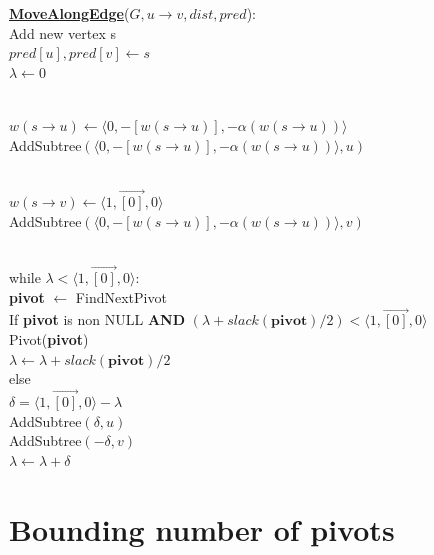 \documentclass{article}
\begin{document}
\begin{center}
\begin{algorithm}
\textbf{\underline{MoveAlongEdge}}($G, u \rightarrow v, dist, pred$): \\ \quad
Add new vertex s \\ \quad
$pred[u], pred[v] \leftarrow s$ \\ \quad
$\lambda \leftarrow 0$ \\ \\ \quad

$w(s \rightarrow u) \leftarrow \langle 0, -[w(s \rightarrow u)], 
-\alpha(w(s \rightarrow u)) \rangle$ \\ \quad
AddSubtree$(\langle 0, -[w(s \rightarrow u)], 
-\alpha(w(s \rightarrow u)) \rangle, u)$ \\ \\ \quad

$w(s \rightarrow v) \leftarrow \langle 1, \vec{[0]}, 0 \rangle$ \\ \quad
AddSubtree$(\langle 0, -[w(s \rightarrow u)], 
-\alpha(w(s \rightarrow u)) \rangle, v)$ \\ \\ \quad

while $\lambda < \langle 1, \vec{[0]}, 0 \rangle$: \\ \quad \quad
    \textbf{pivot} $\leftarrow $ FindNextPivot \\ \quad \quad
    If \textbf{pivot} is non NULL \textbf{AND} 
    $(\lambda + slack(\textbf{pivot}) / 2) < \langle 1, \vec{[0]}, 0 \rangle$ \\ \qquad \quad
        Pivot(\textbf{pivot}) \\ \qquad \quad
        $\lambda \leftarrow \lambda + slack(\textbf{pivot}) / 2$ \\ \quad \quad
    else \\ \qquad \quad
        $\delta = \langle 1, \vec{[0]}, 0 \rangle - \lambda$ \\ \qquad \quad
        AddSubtree$(\delta, u)$ \\ \qquad \quad
        AddSubtree$(-\delta, v)$ \\ \qquad \quad
        $\lambda \leftarrow \lambda + \delta$ \\
\end{algorithm}
\end{center}

\section{Bounding number of pivots}
\end{document}
